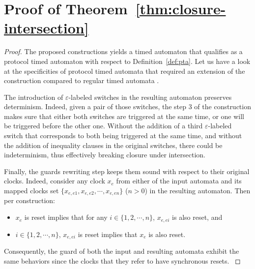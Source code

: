 
\section{Proof of Theorem~\ref{thm:closure-intersection}}


\begin{proof}
The proposed constructions yields a timed automaton that qualifies as a protocol timed automaton with respect to Definition~\ref{def:pta}. Let us have a look at the specificities of protocol timed automata that required an extension of the construction compared to regular timed automata \cite{RADLD94}.

The introduction of $\varepsilon$-labeled switches in the resulting automaton preserves determinism. Indeed, given a pair of those switches, the step 3 of the construction makes sure that either both switches are triggered at the same time, or one will be triggered before the other one. Without the addition of a third $\varepsilon$-labeled switch that corresponds to both being triggered at the same time, and without the addition of inequality clauses in the original switches, there could be indeterminism, thus effectively breaking closure under intersection.

Finally, the guards rewriting step keeps them sound with respect to their original clocks. Indeed, consider any clock $x_e$ from either of the input automata and its mapped clocks set $\{ x_{e,e1}, x_{e,e2}, \cdots, x_{e,en} \}$ ($n > 0$) in the resulting automaton. Then per construction:
\begin{itemize}
  
  \item $x_e$ is reset implies that for any $i \in \{1, 2, \cdots, n\}$, $x_{e,ei}$ is also reset, and
  
  \item $i \in \{1, 2, \cdots, n\}$, $x_{e,ei}$ is reset implies that $x_e$ is also reset.
  
\end{itemize}
Consequently, the guard of both the input and resulting automata exhibit the same behaviors since the clocks that they refer to have synchronous resets.
\label{proof:closure-intersection}
\end{proof}


